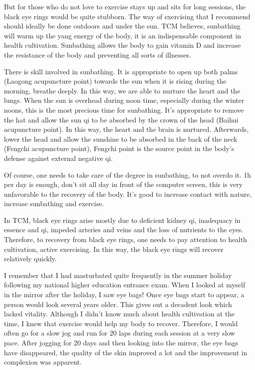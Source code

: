 \documentclass[
]{book}
\begin{document}
But for those who do not love to exercise stays up and sits for long sessions, the black eye rings would be quite stubborn. The way of exercising that I recommend should ideally be done outdoors and under the sun. TCM believes, sunbathing will warm up the yang energy of the body, it is an indispensable component in health cultivation. Sunbathing allows the body to gain vitamin D and increase the resistance of the body and preventing all sorts of illnesses.

There is skill involved in sunbathing. It is appropriate to open up both palms (Laogong acupuncture point) towards the sun when it is rising during the morning, breathe deeply. In this way, we are able to nurture the heart and the lungs. When the sun is overhead during noon time, especially during the winter noons, this is the most precious time for sunbathing. It's appropriate to remove the hat and allow the sun qi to be absorbed by the crown of the head (Baihui acupuncture point). In this way, the heart and the brain is nurtured. Afterwards, lower the head and allow the sunshine to be absorbed in the back of the neck (Fengchi acupuncture point), Fengchi point is the source point in the body's defense against external negative qi.

Of course, one needs to take care of the degree in sunbathing, to not overdo it. 1h per day is enough, don't sit all day in front of the computer screen, this is very unfavorable to the recovery of the body. It's good to increase contact with nature, increase sunbathing and exercise.

In TCM, black eye rings arise mostly due to deficient kidney qi, inadequacy in essence and qi, impeded arteries and veins and the loss of nutrients to the eyes. Therefore, to recovery from black eye rings, one needs to pay attention to health cultivation, active exercising. In this way, the black eye rings will recover relatively quickly.

I remember that I had masturbated quite frequently in the summer holiday following my national higher education entrance exam. When I looked at myself in the mirror after the holiday, I saw eye bags! Once eye bags start to appear, a person would look several years older. This gives out a decadent look which lacked vitality. Although I didn't know much about health cultivation at the time, I knew that exercise would help my body to recover. Therefore, I would often go for a slow jog and run for 20 laps during each session at a very slow pace. After jogging for 20 days and then looking into the mirror, the eye bags have disappeared, the quality of the skin improved a lot and the improvement in complexion was apparent.
\end{document}
